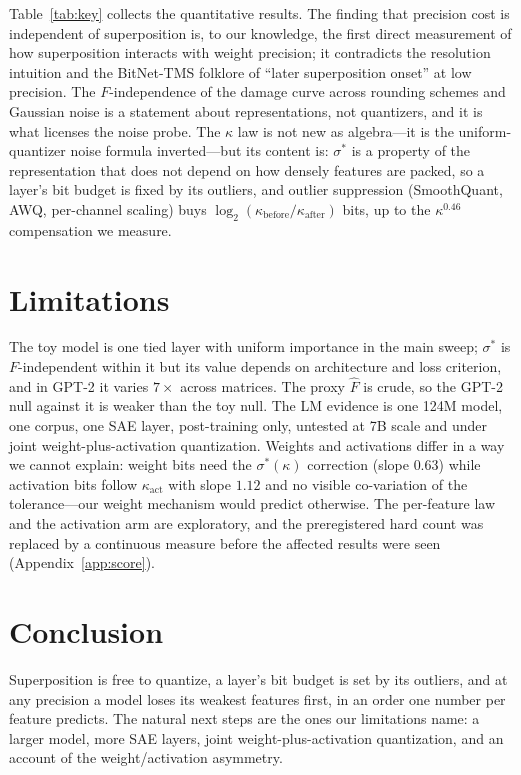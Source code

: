 \documentclass{article}
\begin{document}
Table~\ref{tab:key} collects the quantitative results. The finding that precision cost is independent of superposition is, to our knowledge, the first
direct measurement of how superposition interacts with weight precision; it contradicts the resolution intuition and the
BitNet-TMS folklore of ``later superposition onset'' at low precision. The $F$-independence of the damage curve across
rounding schemes and Gaussian noise is a statement about representations, not quantizers, and it is what licenses the
noise probe. The $\kappa$ law is not new as algebra---it is the uniform-quantizer noise formula inverted---but its
content is: $\sigma^*$ is a property of the representation that does not depend on how densely features are packed,
so a layer's bit budget is fixed by its outliers, and outlier suppression (SmoothQuant, AWQ, per-channel scaling) buys
$\log_2(\kappa_{\mathrm{before}}/\kappa_{\mathrm{after}})$ bits, up to the $\kappa^{0.46}$ compensation we measure.

\section{Limitations}
The toy model is one tied layer with uniform importance in the main sweep; $\sigma^*$ is $F$-independent within it but its
value depends on architecture and loss criterion, and in GPT-2 it varies $7\times$ across matrices. The proxy $\hat F$ is
crude, so the GPT-2 null against it is weaker than the toy null. The LM evidence is one 124M model, one corpus, one SAE
layer, post-training only, untested at 7B scale and under joint weight-plus-activation quantization. Weights and
activations differ in a way we cannot explain: weight bits need the $\sigma^*(\kappa)$ correction (slope $0.63$) while
activation bits follow $\kappa_{\mathrm{act}}$ with slope $1.12$ and no visible co-variation of the tolerance---our weight
mechanism would predict otherwise. The per-feature law and the activation arm are exploratory, and the preregistered hard count was replaced by a
continuous measure before the affected results were seen (Appendix~\ref{app:score}).

\section{Conclusion}
Superposition is free to quantize, a layer's bit budget is set by its outliers, and at any precision a model
loses its weakest features first, in an order one number per feature predicts. The natural next steps are the ones our
limitations name: a larger model, more SAE layers, joint weight-plus-activation quantization, and an account of the
weight/activation asymmetry.
\end{document}

